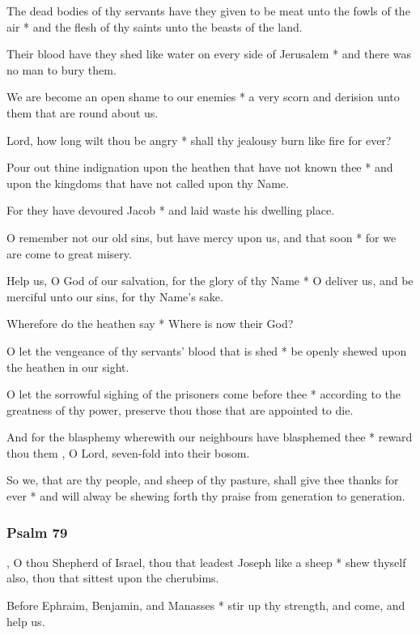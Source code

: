 The dead bodies of thy servants have they given to be meat unto the fowls of the air * and the flesh of thy saints unto the beasts of the land.

Their blood have they shed like water on every side of Jerusalem * and there was no man to bury them.

We are become an open shame to our enemies * a very scorn and derision unto them that are round about us.

Lord, how long wilt thou be angry * shall thy jealousy burn like fire for ever?

Pour out thine indignation upon the heathen that have not known thee * and upon the kingdoms that have not called upon thy Name.

For they have devoured Jacob * and laid waste his dwelling place.

O remember not our old sins, but have mercy upon us, and that soon * for we are come to great misery.

Help us, O God of our salvation, for the glory of thy Name * O deliver us, and be merciful unto our sins, for thy Name's sake.

Wherefore do the heathen say * Where is now their God?

O let the vengeance of thy servants' blood that is shed * be openly shewed upon the heathen in our sight.

O let the sorrowful sighing of the prisoners come before thee * according to the greatness of thy power, preserve thou those that are appointed to die.

And for the blasphemy wherewith our neighbours have blasphemed thee * reward thou them , O Lord, seven-fold into their bosom.

So we, that are thy people, and sheep of thy pasture, shall give thee thanks for ever * and will alway be shewing forth thy praise from generation to generation.

\subsubsection{Psalm 79}


, O thou Shepherd of Israel, thou that leadest Joseph like a sheep * shew thyself also, thou that sittest upon the cherubims.

Before Ephraim, Benjamin, and Manasses * stir up thy strength, and come, and help us.

